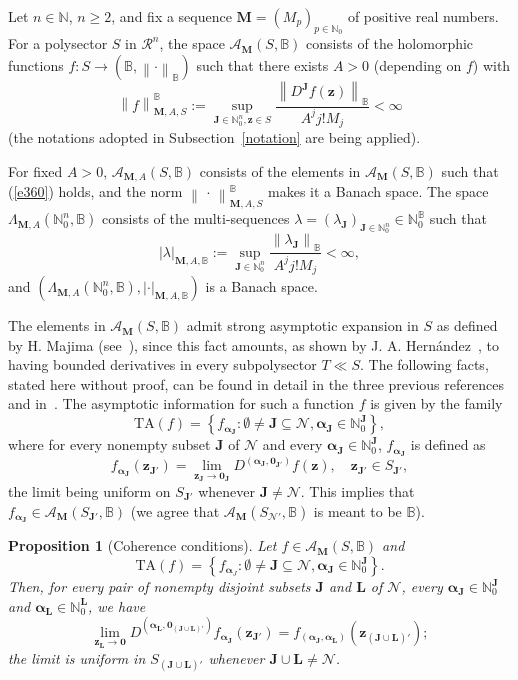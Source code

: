 \documentclass[11pt,a4paper,leqno]{article}
\theoremstyle{plain}
\newtheorem{prop}[theo]{Proposition}
\theoremstyle{definition}
\def\N{\mathbb{N}}
\def\balpha{\boldsymbol{\alpha}}
\def\bJ{\boldsymbol{J}}
\def\bL{\boldsymbol{L}}
\def\bM{\boldsymbol{M}}
\def\bz{\boldsymbol{z}}
\begin{document}
Let $n\in\N$, $n\ge 2$, and fix a sequence $\bM=(M_{p})_{p\in\N_0}$ of positive real numbers. For a polysector $S$ in $\mathcal{R}^{n}$, the space $\mathcal{A}_{\bM}(S,\mathbb{B})$ consists of the holomorphic functions $f:S\to(\mathbb{B},\left\|\cdot\right\|_{\mathbb{B}})$ such that there exists $A>0$ (depending on $f$) with
\begin{equation}\label{e360}
\left\|f\right\|^{\mathbb{B}}_{\bM,A,S}:=\sup_{\bJ\in\N_{0}^{n},\bz\in S}\frac{\left\|D^{\bJ}f(\bz)\right\|_{\mathbb{B}}}{A^jj!M_j}<\infty
\end{equation}
(the notations adopted in Subsection~\ref{notation} are being applied).\par
For fixed $A>0$, $\mathcal{A}_{\bM,A}(S,\mathbb{B})$ consists of the elements in $\mathcal{A}_{\bM}(S,\mathbb{B})$ such that (\ref{e360}) holds, and the norm $\left\|\,\cdot\,\right\|^{\mathbb{B}}_{\bM,A,S}$ makes it a Banach space.
The space $\Lambda_{\bM,A}(\N_{0}^{n},\mathbb{B})$ consists of the multi-sequences $\lambda=(\lambda_{\bJ})_{\bJ\in\N_{0}^{n}}\in\N_{0}^{\mathbb{B}}$ such that
$$|\lambda|_{\bM,A,\mathbb{B}}:= \sup_{\bJ\in\N_{0}^{n}}\frac{\left\|\lambda_{\bJ}\right\|_{\mathbb{B}}}{A^{j}j!M_j}<\infty,$$
and $(\Lambda_{\bM,A}(\N_{0}^n,\mathbb{B}),|\cdot|_{\bM,A,\mathbb{B}})$ is a Banach space.\par
The elements in $\mathcal{A}_{\bM}(S,\mathbb{B})$ admit strong asymptotic expansion in $S$ as defined by H. Majima (see~\cite{Majima1,Majima2}), since this fact amounts, as shown by J. A. Hern\'andez~\cite{hernandez}, to having bounded derivatives in every subpolysector $T\ll S$.
The following facts, stated here without proof, can be found in detail in the three previous references and in~\cite{galindosanz,hernandezsanz,lastrasanz}.
The asymptotic information for such a function $f$ is given by the family
$$\mathrm{TA}(f)=\left\{f_{\balpha_{\bJ}}:\emptyset\neq \bJ\subseteq\mathcal{N},\balpha_{\bJ}\in\N_{0}^{\bJ}\right\},$$
where for every nonempty subset $\bJ$ of $\mathcal{N}$ and every $\balpha_{\bJ}\in\N_{0}^{\bJ}$, $f_{\balpha_{\bJ}}$ is defined as
$$f_{\balpha_{\bJ}}(\bz_{\bJ'})=\lim_{\bz_{\bJ}\to\textbf{0}_{\bJ}} D^{(\balpha_{\bJ},\textbf{0}_{\bJ'})}f(\bz),\quad \bz_{\bJ'}\in S_{\bJ'},$$
the limit being uniform on $S_{\bJ'}$ whenever $\bJ\neq\mathcal{N}$. This implies that $f_{\balpha_{\bJ}}\in\mathcal{A}_{\bM}(S_{\bJ'},\mathbb{B})$ (we agree that $\mathcal{A}_{\bM}(S_{\mathcal{N}'},\mathbb{B})$ is meant to be $\mathbb{B}$).
\begin{prop}[Coherence conditions]
Let $f\in\mathcal{A}_{\bM}(S,\mathbb{B})$ and
$$\mathrm{TA}(f)=\left\{f_{\balpha_{J}}:\emptyset\neq \bJ\subseteq\mathcal{N},\balpha_{\bJ}\in\N_{0}^{\bJ}\right\}.$$
Then, for every pair of nonempty disjoint subsets $\bJ$ and $\bL$ of $\mathcal{N}$, every $\balpha_{\bJ}\in\N_{0}^{\bJ}$ and $\balpha_{\bL}\in\N_{0}^{\bL}$, we have
\begin{equation}\label{e380}
\lim_{\bz_{\bL}\to\textbf{0}}D^{(\balpha_{\bL},\textbf{0}_{(\bJ\cup \bL)'})}f_{\balpha_{\bJ}}(\bz_{\bJ'})=f_{(\balpha_{\bJ},\balpha_{\bL})}(\bz_{(\bJ\cup \bL)'});
\end{equation}
the limit is uniform in $S_{(\bJ\cup \bL)'}$ whenever $\bJ\cup \bL\neq \mathcal{N}$.
\end{prop}
\end{document}
